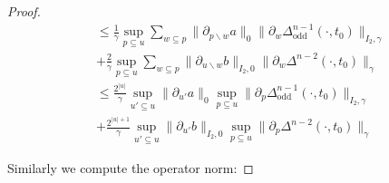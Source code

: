 \documentclass[b5paper,draft,openbib,12pt]{memoir}
\DeclareMathOperator{\odd}{odd}
\begin{document}
\begin{proof}
\begin{align}
&\le
\frac{1}{\gamma} \sup_{p\subseteq u} \sum_{w\subseteq p} 
\| \partial_{p\backslash w}a\|_{0}
\|\partial_w \Delta^{n-1}_{\odd}(\cdot,t_0)\|_{I_2,\gamma}\\
&+\frac{2}{\gamma} \sup_{p\subseteq u} \sum_{w\subseteq p} 
\|  \partial_{u\backslash w}b\|_{I_2,0}
\|\partial_w \Delta^{n-2}(\cdot,t_0) \|_{\gamma}\\
&\le
\frac{2^{|u|}}{\gamma} \sup_{u'\subseteq u} 
\| \partial_{u'}a\|_{0} \sup_{p\subseteq u} 
\|\partial_p \Delta^{n-1}_{\odd}(\cdot,t_0)\|_{I_2,\gamma}\\
&+\frac{2^{|u|+1}}{\gamma} \sup_{u'\subseteq u} 
\|  \partial_{u'}b\|_{I_2,0}\sup_{p\subseteq u}
\|\partial_p \Delta^{n-2}(\cdot,t_0) \|_{\gamma}
\end{align}

Similarly we compute the operator norm:


\end{proof}
\end{document}
